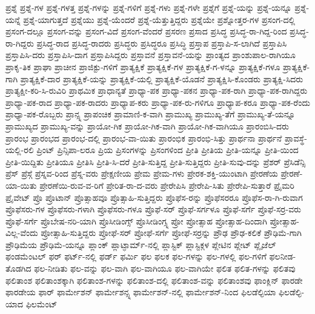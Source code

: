 {ಪ್ರಶ್ನೆ
ಪ್ರಶ್ನೆ-ಗಳ
ಪ್ರಶ್ನೆ-ಗಳತ್ತ
ಪ್ರಶ್ನೆ-ಗಳನ್ನು
ಪ್ರಶ್ನೆ-ಗಳಿಗೆ
ಪ್ರಶ್ನೆ-ಗಳು
ಪ್ರಶ್ನೆ-ಗಳೇ
ಪ್ರಶ್ನೆಗೆ
ಪ್ರಶ್ನೆ-ಯನ್ನು
ಪ್ರಶ್ನೆ-ಯನ್ನೂ
ಪ್ರಶ್ನೆ-ಯನ್ನೆ
ಪ್ರಶ್ನೆ-ಯಾಗುತ್ತದೆ
ಪ್ರಶ್ನೆಯು
ಪ್ರಶ್ನೆ-ಯೆಂದರೆ
ಪ್ರಶ್ನೆ-ಯೆತ್ತುತ್ತಿದ್ದರು
ಪ್ರಶ್ನೆಯೇ
ಪ್ರಶ್ನೋತ್ತರ-ಗಳ
ಪ್ರಸಂಗ-ದಲ್ಲಿ
ಪ್ರಸಂಗ-ದಲ್ಲೂ
ಪ್ರಸಂಗ-ವನ್ನು
ಪ್ರಸಂಗ-ವಿದೆ
ಪ್ರಸಂಗ-ವೆಂದರೆ
ಪ್ರಸರಣ
ಪ್ರಸಾದ
ಪ್ರಸಿದ್ಧ
ಪ್ರಸಿದ್ಧ-ರಾ-ಗಿದ್ದ-ರಿಂದ
ಪ್ರಸಿದ್ಧ-ರಾ-ಗಿದ್ದರು
ಪ್ರಸಿದ್ಧ-ರಾದ
ಪ್ರಸಿದ್ಧ-ರಾದರು
ಪ್ರಸಿದ್ಧರು
ಪ್ರಸಿದ್ಧರೂ
ಪ್ರಸಿದ್ಧಿ
ಪ್ರಸ್ತಾಪ
ಪ್ರಸ್ತಾಪಿ-ಸ-ಲಾಗಿದೆ
ಪ್ರಸ್ತಾಪಿಸಿ
ಪ್ರಸ್ತಾಪಿಸಿ-ದರು
ಪ್ರಸ್ತಾಪಿಸಿ-ದಾಗ
ಪ್ರಸ್ತಾಪಿಸಿದ್ದರು
ಪ್ರಸ್ತಾವನೆ
ಪ್ರಸ್ತಾವನೆ-ಯನ್ನು
ಪ್ರಾಂತ್ಯದ
ಪ್ರಾಂಶುಪಾಲ-ರಾಗಿಯೂ
ಪ್ರಾಕೃ-ತಿಕ
ಪ್ರಾಘಾ
ಪ್ರಾಚೀನ
ಪ್ರಾಜಿಕ್ಟು-ಗಳಿಗೆ
ಪ್ರಾತ್ಯಕ್ಷಿಕೆ
ಪ್ರಾತ್ಯಕ್ಷಿಕೆ-ಗಳ
ಪ್ರಾತ್ಯಕ್ಷಿಕೆ-ಗ-ಳನ್ನೂ
ಪ್ರಾತ್ಯಕ್ಷಿಕೆ-ಗಳೂ
ಪ್ರಾತ್ಯಕ್ಷಿಕೆ-ಗಾಗಿ
ಪ್ರಾತ್ಯಕ್ಷಿಕೆ-ದಾರ
ಪ್ರಾತ್ಯಕ್ಷಿಕೆ-ಯನ್ನು
ಪ್ರಾತ್ಯಕ್ಷಿಕೆ-ಯಲ್ಲಿ
ಪ್ರಾತ್ಯಕ್ಷಿಕೆ-ಯೊಡನೆ
ಪ್ರಾತ್ಯಕ್ಷಿಸಿ-ಕೊಂಡರು
ಪ್ರಾತ್ಯಕ್ಷಿ-ಸಿದರು
ಪ್ರಾತ್ಯಕ್ಷೀ-ಕರಿ-ಸಿ-ರುವಿರಿ
ಪ್ರಾಥಮಿಕ
ಪ್ರಾಧಾನ್ಯತೆ
ಪ್ರಾಧ್ಯಾ-ಪಕ
ಪ್ರಾಧ್ಯಾ-ಪಕನ
ಪ್ರಾಧ್ಯಾ-ಪಕ-ರಾಗಿ
ಪ್ರಾಧ್ಯಾ-ಪಕ-ರಾಗಿದ್ದರು
ಪ್ರಾಧ್ಯಾ-ಪಕ-ರಾದ
ಪ್ರಾಧ್ಯಾ-ಪಕ-ರಾದರು
ಪ್ರಾಧ್ಯಾಪ-ಕರು
ಪ್ರಾಧ್ಯಾ-ಪಕ-ರು-ಗಳಿಗೂ
ಪ್ರಾಧ್ಯಾಪ-ಕರೂ
ಪ್ರಾಧ್ಯಾ-ಪಕ-ರೆಂದು
ಪ್ರಾಧ್ಯಾ-ಪಕ-ರೊಬ್ಬರು
ಪ್ರಾನ್ಸ್ನ
ಪ್ರಾಪಂಚಿಕ
ಪ್ರಾಮಾಣಿ-ಕ-ವಾಗಿ
ಪ್ರಾಮುಖ್ಯ
ಪ್ರಾಮುಖ್ಯ-ತೆಗೆ
ಪ್ರಾಮುಖ್ಯ-ತೆ-ಯನ್ನೂ
ಪ್ರಾಮುಖ್ಯದ
ಪ್ರಾಮುಖ್ಯ-ವನ್ನು
ಪ್ರಾಯೋ-ಗಿಕ
ಪ್ರಾಯೋ-ಗಿಕ-ವಾಗಿ
ಪ್ರಾಯೋ-ಗಿಕ-ವಾಗಿಯೂ
ಪ್ರಾರಂಬಿಸಿ-ದರು
ಪ್ರಾರಂಭ
ಪ್ರಾರಂಭದ
ಪ್ರಾರಂಭ-ದಲ್ಲಿ
ಪ್ರಾರಂಭ-ವಾ-ಯಿತು
ಪ್ರಾರಂಭಿಕ
ಪ್ರಾರಂಭಿ-ಸಿತ್ತು
ಪ್ರಾರ್ಥನಾ
ಪ್ರಾರ್ಥನೆ
ಪ್ರಾವಸ್ಥೆ-ಯಲ್ಲಿ-ರಲಿ
ಪ್ರಿಂಟ್
ಪ್ರಿನ್ಸಿಪಾ-ಲರೂ
ಪ್ರಿಯ
ಪ್ರಿಸಂಗಳನ್ನು
ಪ್ರಿಸಂಗಳಿಂದ
ಪ್ರೀತಿ
ಪ್ರೀತಿಯ
ಪ್ರೀತಿ-ಯನ್ನೂ
ಪ್ರೀತಿ-ಯಿಂದ
ಪ್ರೀತಿ-ಯಿದ್ದಿತು
ಪ್ರೀತಿಯೂ
ಪ್ರೀತಿಸಿ
ಪ್ರೀತಿ-ಸಿ-ದರೆ
ಪ್ರೀತಿ-ಸುತ್ತಿದ್ದ
ಪ್ರೀತಿ-ಸುತ್ತಿದ್ದರು
ಪ್ರೀತಿ-ಸುವು-ದನ್ನು
ಪ್ರೆಶರ್
ಪ್ರೆಸಿಡೆನ್ಸಿ
ಪ್ರೆಸ್
ಪ್ರೆಸ್ಗೆ
ಪ್ರೆಸ್ನವ-ರಿಂದ
ಪ್ರೆಸ್ನ-ವರು
ಪ್ರೇಕ್ಷಣೀಯ
ಪ್ರೇಮ
ಪ್ರೇಮ-ಗಳು
ಪ್ರೇರಕ-ಶಕ್ತಿ-ಯುಂಟಾಗಿ
ಪ್ರೇರಣೆಯ
ಪ್ರೇರಣೆ-ಯಾ-ಯಿತು
ಪ್ರೇರಣೆಯಿ-ರುವ-ವ-ರಿಗೆ
ಪ್ರೇರಿತ-ರಾ-ದ-ವರು
ಪ್ರೇರೇಪಿಸಿ
ಪ್ರೇರೇಪಿ-ಸಿತು
ಪ್ರೇರೇಪಿ-ಸುತ್ತಾರೆ
ಪ್ರೈಮರಿ
ಪ್ರೈವೇಟ್
ಪ್ರೊ
ಪ್ರೊಟಾನ್
ಪ್ರೊತ್ಸಾಹವೂ
ಪ್ರೊತ್ಸಾಹಿ-ಸುತ್ತಿದ್ದರು
ಪ್ರೊಫೆಸ-ರನ್ನು
ಪ್ರೊಫೆಸರರೂ
ಪ್ರೊಫೆಸ-ರಾ-ಗಿ-ರುವಾಗ
ಪ್ರೊಫೆಸರು-ಗಳ
ಪ್ರೊಫೆಸರು-ಗಳಾಗಿ
ಪ್ರೊಫೆಸರು-ಗಳೂ
ಪ್ರೊಫೆ-ಸರ್
ಪ್ರೊಫೆ-ಸರ್ಗಳೂ
ಪ್ರೊಫೆ-ಸರ್ಗೆ
ಪ್ರೊಫೆ-ಸರ್ರ-ವರು
ಪ್ರೊಫೆ-ಸರ್ಗೆ
ಪ್ರೊಬೇಷ-ನರಿ-ಯಾಗಿ
ಪ್ರೊಸೀಡಿಂಗ್ಸ್
ಪ್ರೊಸೀಡಿಂಗ್ಸ್ನ
ಪ್ರೋ
ಪ್ರೋತ್ಸಾಹ
ಪ್ರೋತ್ಸಾಹ-ದಿಂದಾಗಿ
ಪ್ರೋತ್ಸಾಹ-ವಿಲ್ಲ-ವೆಂದು
ಪ್ರೋತ್ಸಾಹಿ-ಸುತ್ತಿದ್ದರು
ಪ್ರೋಫೆ-ಸರ್
ಪ್ರೋಫೆ-ಸರ್ಗೆ
ಪ್ರೋಫೆ-ಸರ್ರನ್ನು
ಪ್ರೌಢ
ಪ್ರೌಢ-ಕಲಿಕೆ
ಪ್ರೌಢಿಮೆ-ಗಾಗಿ
ಪ್ರೌಢಿಮೆಯ
ಪ್ರೌಢಿಮೆ-ಯನ್ನೂ
ಪ್ಲಾಂಕ್
ಪ್ಲಾಟ್ಫಾರ್ಮ್-ನಲ್ಲಿ
ಪ್ಲಾಸ್ಟಿಕ್
ಪ್ಲಾಸ್ಟಿಕ್ಗಳ
ಪ್ಲೇಟಿನ
ಪ್ಲೇಟ್
ಪ್ಲೈಜೆಲ್
ಫಂಡಮೆಂಟಲ್
ಫರ್
ಫರ್ಟ್-ನಲ್ಲಿ
ಫರ್ಡ್
ಫರ್ಮಿ
ಫಲ
ಫಲಕ
ಫಲ-ಗಳನ್ನು
ಫಲ-ಗಳಲ್ಲಿ
ಫಲ-ಗಳಿಗೆ
ಫಲನೀಡ-ತೊಡಗಿದ
ಫಲ-ನೀಡಿತು
ಫಲ-ವನ್ನು
ಫಲ-ವಾಗಿ
ಫಲ-ವಾಗಿಯೂ
ಫಲ-ವಾಗಿಯೇ
ಫಲಿತ
ಫಲಿತ-ಗಳನ್ನು
ಫಲಿತವು
ಫಲಿತಾಂಶ
ಫಲಿತಾಂಶಕ್ಕಾಗಿ
ಫಲಿತಾಂಶ-ಗಳನ್ನು
ಫಲಿತಾಂಶ-ದಲ್ಲಿ
ಫಲಿತಾಂಶ-ವನ್ನು
ಫಲಿತಾಂಶವು
ಫಾಂಕ್ಲಿನ್
ಫಾರಡೇ
ಫಾರಡೇಯ
ಫಾರ್
ಫಾರ್ಮೇಶನ್
ಫಾರ್ಮೇಶನ್ಸ್ನ
ಫಾರ್ಮೇಶನ್-ನಲ್ಲಿ
ಫಾರ್ಮೇಶನ್-ನಿಂದ
ಫಿಲಡೆಲ್ಫಿಯಾ
ಫಿಲಡೆಲ್ಫಿ-ಯಾದ
ಫಿಲಮೆಂಟ್
}
